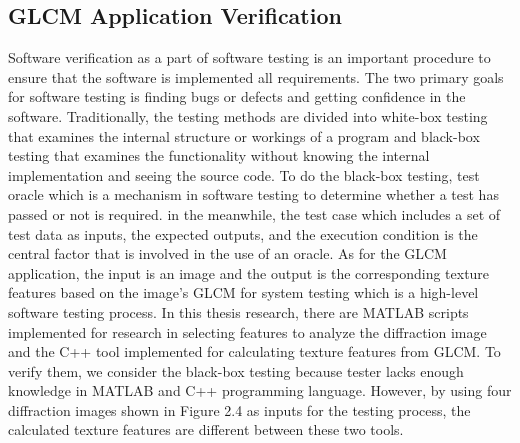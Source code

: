 \subsection{GLCM Application Verification}
Software verification as a part of software testing is an important procedure to ensure that the software is implemented all requirements. The two primary goals for software testing is finding bugs or defects and getting confidence in the software\cite{Jiantao}. Traditionally, the testing methods are divided into white-box testing that examines the internal structure or workings of a program and black-box testing that examines the functionality without knowing the internal implementation and seeing the source code. To do the black-box testing, test oracle which is a mechanism in software testing to determine whether a test has passed or not\cite{Kaner} is required. in the meanwhile, the test case which includes a set of test data as inputs, the expected outputs, and the execution condition is the central factor that is involved in the use of an oracle. As for the GLCM application, the input is an image and the output is the corresponding texture features based on the image's GLCM for system testing which is a high-level software testing process.
In this thesis research, there are MATLAB scripts implemented for research in selecting features to analyze the diffraction image\cite{Thati} and the C++ tool implemented for calculating texture features from GLCM. To verify them, we consider the black-box testing because tester lacks enough knowledge in MATLAB and C++ programming language. However, by using four diffraction images shown in Figure 2.4 as inputs for the testing process, the calculated texture features are different between these two tools. 
